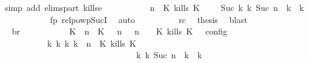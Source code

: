 \begin{isabellebody}
\ {\isacharparenleft}simp\ add{\isacharcolon}\ elims{\isacharunderscore}part\ kills{\isacharunderscore}e{}{\isacharparenright}\isanewline
\ \ \ \ \ \ \ \ \isamarkupfalse%
\ {\isacartoucheopen}{\isacharparenleft}{\isasymGamma}{\isacharcomma}\ n\ {\isasymturnstile}\ {\isacharparenleft}K\ kills\ K\ {\isacharhash}\ {\isasymPsi}\ {\isasymtriangleright}\ {\isasymPhi}{\isacharparenright}\ {\isasymhookrightarrow}\isactrlbsup Suc\ k\isactrlesup \ {\isacharparenleft}{\isasymGamma}\isactrlsub k{\isacharcomma}\ Suc\ n\ {\isasymturnstile}\ {\isasymPsi}\isactrlsub k\ {\isasymtriangleright}\ {\isasymPhi}\isactrlsub k{\isacharparenright}{\isacartoucheclose}\isanewline
\ \ \ \ \ \ \ \ \ \ \isamarkupfalse%
\ fp\ relpowp{\isacharunderscore}Suc{\isacharunderscore}I{}\ \isamarkupfalse%
\ auto\isanewline
\ \ \ \ \ \ \ \ \isamarkupfalse%
\ rc\ \isamarkupfalse%
\ {\isacharquery}thesis\ \isamarkupfalse%
\ blast\isanewline
\ \ \ \ \ \ \isamarkupfalse%
\isanewline
\ \ \ \ \ \ \isamarkupfalse%
\ \isamarkupfalse%
\ br{}{\isacharcolon}\isanewline
\ \ \ \ \ \ \ \ {\isacartoucheopen}{\isasymrho}\ {\isasymin}\ {\isasymlbrakk}\ {\isacharparenleft}{\isacharparenleft}K\ {\isasymUp}\ n{\isacharparenright}\ {\isacharhash}\ {\isacharparenleft}K\ {\isasymnot}{\isasymUp}\ {\isasymge}\ n{\isacharparenright}\ {\isacharhash}\ {\isasymGamma}{\isacharparenright}{\isacharcomma}\ n\ {\isasymturnstile}\ {\isasymPsi}\ {\isasymtriangleright}\ {\isacharparenleft}{\isacharparenleft}K\ kills\ K\ {\isacharhash}\ {\isasymPhi}{\isacharparenright}\ {\isasymrbrakk}\isactrlsub c\isactrlsub o\isactrlsub n\isactrlsub f\isactrlsub i\isactrlsub g\isanewline
\ \ \ \ \ \ \ \ \ \ {\isasymLongrightarrow}\ {\isasymexists}{\isasymGamma}\isactrlsub k\ {\isasymPsi}\isactrlsub k\ {\isasymPhi}\isactrlsub k\ k{\isachardot}\ {\isacharparenleft}{\isacharparenleft}{\isasymGamma}{\isacharcomma}\ n\ {\isasymturnstile}\ {\isacharparenleft}{\isacharparenleft}K\ kills\ K\ {\isacharhash}\ {\isasymPsi}{\isacharparenright}\ {\isasymtriangleright}\ {\isasymPhi}{\isacharparenright}\isanewline
\ \ \ \ \ \ \ \ \ \ \ \ \ \ \ \ \ \ \ \ \ \ \ \ \ \ \ \ \ \ \ \ {\isasymhookrightarrow}\isactrlbsup k\isactrlesup \ {\isacharparenleft}{\isasymGamma}\isactrlsub k{\isacharcomma}\ Suc\ n\ {\isasymturnstile}\ {\isasymPsi}\isactrlsub k\ {\isasymtriangleright}\ {\isasymPhi}\isactrlsub k{\isacharparenright}{\isacharparenright}\isanewline

\end{isabellebody}
